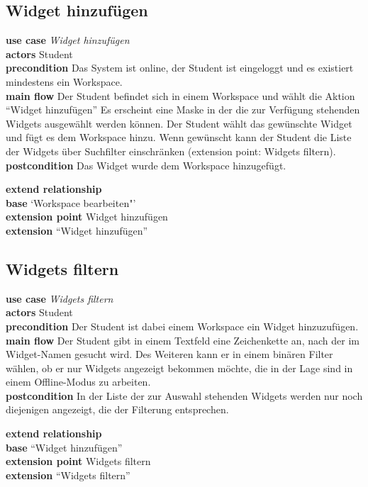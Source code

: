 \subsection{Widget hinzufügen}
\textbf{use case} \emph{Widget hinzufügen}\\
\textbf{actors} Student\\
\textbf{precondition} Das System ist online, der Student ist eingeloggt und es existiert mindestens ein Workspace.\\
\textbf{main flow} Der Student befindet sich in einem Workspace und wählt die Aktion "`Widget hinzufügen"' Es erscheint eine Maske in der die zur Verfügung stehenden Widgets ausgewählt werden können. Der Student wählt das gewünschte Widget und fügt es dem Workspace hinzu. Wenn gewünscht kann der Student die Liste der Widgets über Suchfilter einschränken (extension point: Widgets filtern).\\
\textbf{postcondition} Das Widget wurde dem Workspace hinzugefügt.

\textbf{extend relationship}\\
\textbf{base} `Workspace bearbeiten"'\\
\textbf{extension point} Widget hinzufügen\\
\textbf{extension} "`Widget hinzufügen"'

\subsection{Widgets filtern}
\textbf{use case} \emph{Widgets filtern}\\
\textbf{actors} Student\\
\textbf{precondition} Der Student ist dabei einem Workspace ein Widget hinzuzufügen.\\
\textbf{main flow} Der Student gibt in einem Textfeld eine Zeichenkette an, nach der im Widget-Namen gesucht wird. Des Weiteren kann er in einem binären Filter wählen, ob er nur Widgets angezeigt bekommen möchte, die in der Lage sind in einem Offline-Modus zu arbeiten.\\
\textbf{postcondition} In der Liste der zur Auswahl stehenden Widgets werden nur noch diejenigen angezeigt, die der Filterung entsprechen.
 
\textbf{extend relationship}\\
\textbf{base} "`Widget hinzufügen"'\\
\textbf{extension point} Widgets filtern\\
\textbf{extension} "`Widgets filtern"'
 

